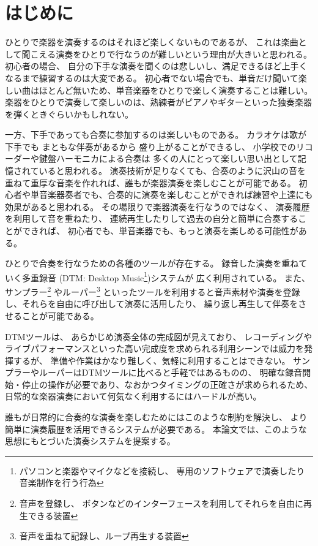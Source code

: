 %
%
\section{はじめに}
\label{sec:start}

ひとりで楽器を演奏するのはそれほど楽しくないものであるが、
これは楽曲として聞こえる演奏をひとりで行なうのが難しいという理由が大きいと思われる。
%
初心者の場合、 自分の下手な演奏を聞くのは悲しいし、満足できるほど上手くなるまで練習するのは大変である。
初心者でない場合でも、単音だけ聞いて楽しい曲はほとんど無いため、単音楽器をひとりで楽しく演奏することは難しい。
楽器をひとりで演奏して楽しいのは、熟練者がピアノやギターといった独奏楽器を弾くときぐらいかもしれない。

一方、下手であっても合奏に参加するのは楽しいものである。
カラオケは歌が下手でも
まともな伴奏があるから
盛り上がることができるし、
小学校でのリコーダーや鍵盤ハーモニカによる合奏は
多くの人にとって楽しい思い出として記憶されていると思われる。
演奏技術が足りなくても、合奏のように沢山の音を重ねて重厚な音楽を作れれば、誰もが楽器演奏を楽しむことが可能である。
初心者や単音楽器奏者でも、合奏的に演奏を楽しむことができれば練習や上達にも効果があると思われる。
%
その場限りで楽器演奏を行なうのではなく、
演奏履歴を利用して音を重ねたり、
連続再生したりして過去の自分と簡単に合奏することができれば、
初心者でも、単音楽器でも、もっと演奏を楽しめる可能性がある。

ひとりで合奏を行なうための各種のツールが存在する。
%
録音した演奏を重ねていく多重録音
(DTM: Desktop Music\footnote{パソコンと楽器やマイクなどを接続し、
    専用のソフトウェアで演奏したり音楽制作を行う行為})システムが
広く利用されている\cite{jacob}\cite{resound}。
%
%
また、サンプラー\footnote{音声を登録し、
    ボタンなどのインターフェースを利用してそれらを自由に再生できる装置}
やルーパー\footnote{音声を重ねて記録し、ループ再生する装置}
といったツールを利用すると音声素材や演奏を登録し、それらを自由に呼び出して演奏に活用したり、
繰り返し再生して伴奏をさせることが可能である。

DTMツールは、
あらかじめ演奏全体の完成図が見えており、
レコーディングやライブパフォーマンスといった高い完成度を求められる利用シーンでは威力を発揮するが、
準備や作業はかなり難しく、気軽に利用することはできない。
%
サンプラーやルーパーはDTMツールに比べると手軽ではあるものの、
明確な録音開始・停止の操作が必要であり、なおかつタイミングの正確さが求められるため、
日常的な楽器演奏において何気なく利用するにはハードルが高い。

誰もが日常的に合奏的な演奏を楽しむためにはこのような制約を解決し、
より簡単に演奏履歴を活用できるシステムが必要である。
本論文では、このような思想にもとづいた演奏システム{\system}を提案する。
